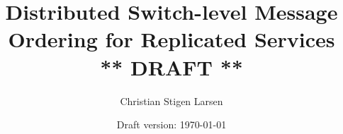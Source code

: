 \documentclass[a4paper,twoside]{report}
\begin{document}
  \author{Christian Stigen Larsen}
  \date{Draft version: \today}
  \title{Distributed Switch-level Message Ordering for Replicated Services
    \\\textsf{** DRAFT **}}

  \maketitle
  
  

  \listoftodos %
  \listoftables
  \listoffigures
  \listofalgorithms{}
  \lstlistoflistings{}

  \tableofcontents

  

  
  
  
  
  
  
  
  
  

  
  

  \appendix
    

  \clearpage %
  \printindex
  
\end{document}
